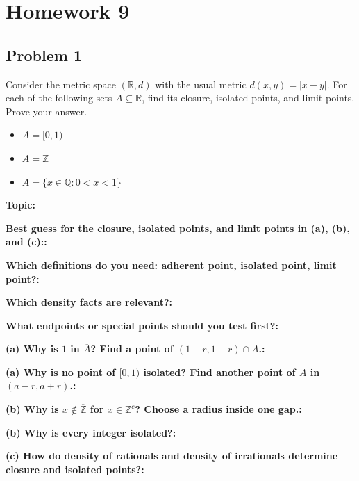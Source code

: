 \documentclass[12pt]{article}
\newcommand{\fillfield}[1]{%
  \par\noindent\textbf{#1:}\enspace\hrulefill\par\vspace{3pt}%
}
\begin{document}
\newpage
\section{Homework 9}

\newpage
\subsection{Problem 1}

\begin{tcolorbox}[
  enhanced, breakable,
  colback  = probblue,
  colframe = blue!55!black,
  fonttitle = \bfseries,
  title = {\textsc{Problem Statement}\hfill Homework 9, Problem 1}
]
Consider the metric space $(\mathbb{R}, d)$ with the usual metric $d(x, y) = |x-y|$. For
each of the following sets $A \subseteq \mathbb{R}$, find its closure, isolated points, and
limit points. Prove your answer.
\begin{itemize}[nosep, leftmargin=1.8em]
  \item[(a)] $A = [0, 1)$
  \item[(b)] $A = \mathbb{Z}$
  \item[(c)] $A = \{x \in \mathbb{Q} : 0 < x < 1\}$
\end{itemize}
\end{tcolorbox}

\bigskip

\begin{tcolorbox}[
  enhanced, breakable,
  colback  = pass1green,
  colframe = green!55!black,
  fonttitle = \bfseries,
  title = {Pass 1 \enspace\textbf{--}\enspace First Diagnosis}
]
\fillfield{Topic}
\fillfield{Best guess for the closure, isolated points, and limit points in (a), (b), and (c):}
\fillfield{Which definitions do you need: adherent point, isolated point, limit point?}
\fillfield{Which density facts are relevant?}
\fillfield{What endpoints or special points should you test first?}
\end{tcolorbox}

\bigskip

\begin{tcolorbox}[
  enhanced, breakable,
  colback  = pass2yellow,
  colframe = yellow!65!black,
  fonttitle = \bfseries,
  title = {Pass 2 \enspace\textbf{--}\enspace Proof Recipe Card}
]
\fillfield{(a) Why is $1$ in $\overline{A}$? Find a point of $(1-r,1+r)\cap A$.}
\fillfield{(a) Why is no point of $[0,1)$ isolated? Find another point of $A$ in $(a-r,a+r)$.}
\fillfield{(b) Why is $x\notin\overline{\mathbb{Z}}$ for $x\in\mathbb{Z}^c$? Choose a radius inside one gap.}
\fillfield{(b) Why is every integer isolated?}
\fillfield{(c) How do density of rationals and density of irrationals determine closure and isolated points?}
\end{tcolorbox}
\end{document}
